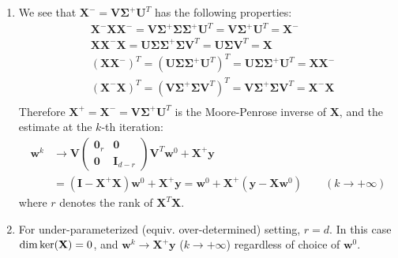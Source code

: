 \documentclass[a4paper, 10pt]{article}
\begin{document}
\begin{enumerate}[label=(\alph*)]
    \item We see that $\mathbf{X}^- = \mathbf{V} \bm{\Sigma}^+ \mathbf{U}^T$ has the following properties:
    \begin{equation}
        \begin{aligned}
            & \mathbf{X}^- \mathbf{X} \mathbf{X}^- = \mathbf{V} \bm{\Sigma}^+ \bm{\Sigma} \bm{\Sigma}^+ \mathbf{U}^T = \mathbf{V} \bm{\Sigma}^+ \mathbf{U}^T = \mathbf{X}^- \\ 
            & \mathbf{X} \mathbf{X}^- \mathbf{X} = \mathbf{U} \bm{\Sigma} \bm{\Sigma}^+ \bm{\Sigma} \mathbf{V}^T = \mathbf{U} \bm{\Sigma} \mathbf{V}^T = \mathbf{X} \\ 
            & \left(\mathbf{X}\mathbf{X}^-\right)^T = \left(\mathbf{U} \bm{\Sigma}\bm{\Sigma}^+ \mathbf{U}^T\right)^T = \mathbf{U} \bm{\Sigma}\bm{\Sigma}^+ \mathbf{U}^T = \mathbf{X} \mathbf{X}^- \\ 
            & \left(\mathbf{X}^-\mathbf{X}\right)^T = \left(\mathbf{V} \bm{\Sigma}^+ \bm{\Sigma} \mathbf{V}^T\right)^T = \mathbf{V} \bm{\Sigma}^+ \bm{\Sigma} \mathbf{V}^T = \mathbf{X}^- \mathbf{X} \\ 
        \end{aligned}
    \end{equation}
    Therefore $\mathbf{X}^+ = \mathbf{X}^- = \mathbf{V} \bm{\Sigma}^+ \mathbf{U}^T$ is the Moore-Penrose inverse of $\mathbf{X}$, and the estimate at the $k$-th iteration:
    \begin{equation}
        \begin{aligned}
            \mathbf{w}^k &\rightarrow \mathbf{V}\begin{pmatrix} \mathbf{0}_r & \mathbf{0} \\ \mathbf{0} & \mathbf{I}_{d-r} \end{pmatrix} \mathbf{V}^T \mathbf{w}^0 + \mathbf{X}^+ \mathbf{y} \\ 
            &= \left(\mathbf{I} - \mathbf{X}^+ \mathbf{X}\right) \mathbf{w}^0 + \mathbf{X}^+ \mathbf{y} = \mathbf{w}^0 + \mathbf{X}^+ \left(\mathbf{y} - \mathbf{X} \mathbf{w}^0\right) \qquad (k\rightarrow +\infty)            
        \end{aligned}
    \end{equation}
    where $r$ denotes the rank of $\mathbf{X}^T \mathbf{X}$.
    
    \item For under-parameterized (equiv. over-determined) setting, $r=d$. In this case ${\rm dim}\, {\rm ker}(\mathbf{X}) = 0$, and $\mathbf{w}^k \rightarrow \mathbf{X}^+ \mathbf{y}$ ($k\rightarrow +\infty$) regardless of choice of $\mathbf{w}^0$.
\end{enumerate}
\end{document}
